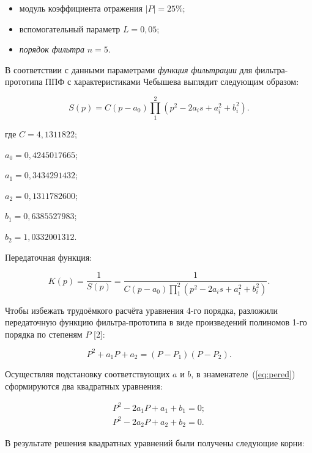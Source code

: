 \begin{itemize}
\item модуль коэффициента отражения $|P| = 25\%$;
\item вспомогательный параметр $L = 0{,}05$;
\item \textit{порядок фильтра} $n = 5$.
\end{itemize}

В соответствии с данными параметрами \textit{функция фильтрации} для
фильтра-прототипа ППФ с характеристиками Чебышева выглядит следующим
образом:

\begin{equation*}
  S(p) = C(p-a_0)\prod_1^2(p^2-2a_is+a^2_i+b^2_i).
\end{equation*}

\begin{ESKDexplanation}
\item[где ] $C = 4{,}1311822$;
\item $a_0 = 0{,}4245017665$;
\item $a_1 = 0{,}3434291432$;
\item $a_2 = 0{,}1311782600$;
\item $b_1 = 0{,}6385527983$;
\item $b_2 = 1{,}0332001312$.
\end{ESKDexplanation}

Передаточная функция:

\begin{equation}
  \label{eq:pered}
  K(p) = \frac{1}{S(p)} = \frac{1}{C(p-a_0)\prod_1^2(p^2-2a_is+a^2_i+b^2_i)}.
\end{equation}

\point Чтобы избежать трудоёмкого расчёта уравнения 4-го порядка,
разложили передаточную функцию фильтра-прототипа в виде произведений
полиномов 1-го порядка по степеням $P$ [2]:

\begin{equation}
  \label{eq:poly_proizv}
  P^2 + a_1P + a_2 = (P - P_1)(P - P_2).
\end{equation}

Осуществляя подстановку соответствующих $a$ и $b$, в
знаменателе~(\ref{eq:pered}) сформируются два квадратных уравнения:

\begin{gather*}
  P^2 - 2a_1P + a_1 + b_1 = 0;\\
  P^2 - 2a_2P + a_2 + b_2 = 0.
\end{gather*}

В результате решения квадратных уравнений были получены следующие
корни:

